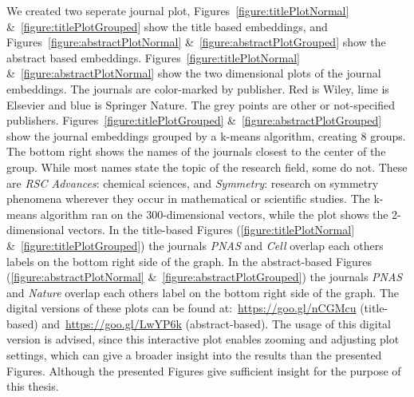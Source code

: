 \documentclass[../../Thesis.tex]{subfiles}
\begin{document}
We created two seperate journal plot, Figures~\ref{figure:titlePlotNormal} \&~\ref{figure:titlePlotGrouped} show the title based embeddings, and Figures~\ref{figure:abstractPlotNormal} \&~\ref{figure:abstractPlotGrouped} show the abstract based embeddings.
Figures~\ref{figure:titlePlotNormal} \&~\ref{figure:abstractPlotNormal} show the two dimensional plots of the journal embeddings. The journals are color-marked by publisher. Red is Wiley, lime is Elsevier and blue is Springer Nature. The grey points are other or not-specified publishers.
Figures~\ref{figure:titlePlotGrouped} \&~\ref{figure:abstractPlotGrouped} show the journal embeddings grouped by a k-means algorithm, creating 8 groups. The bottom right shows the names of the journals closest to the center of the group. While most names state the topic of the research field, some do not. These are \textit{RSC Advances}: chemical sciences, and \textit{Symmetry}:  research on symmetry phenomena wherever they occur in mathematical or scientific studies. The k-means algorithm ran on the 300-dimensional vectors, while the plot shows the 2-dimensional vectors. In the title-based Figures (\ref{figure:titlePlotNormal} \&~\ref{figure:titlePlotGrouped}) the journals \textit{PNAS} and \textit{Cell} overlap each others labels on the bottom right side of the graph. In the abstract-based Figures (\ref{figure:abstractPlotNormal} \&~\ref{figure:abstractPlotGrouped}) the journals \textit{PNAS} and \textit{Nature} overlap each others label on the bottom right side of the graph.
The digital versions of these plots can be found at:~\url{https://goo.gl/nCGMcu} (title-based) and~\url{https://goo.gl/LwYP6k} (abstract-based). The usage of this digital version is advised, since this interactive plot enables zooming and adjusting plot settings, which can give a broader insight into the results than the presented Figures. Although the presented Figures give sufficient insight for the purpose of this thesis.
\end{document}
